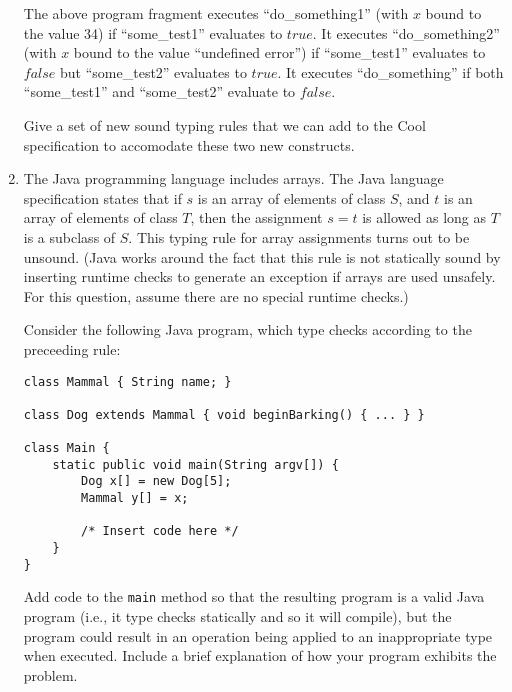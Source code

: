 \documentclass{article}
\begin{document}
\begin{enumerate}
The above program fragment executes
  ``do\_something1'' (with $x$ bound to the value 34) if ``some\_test1''
  evaluates to $true$. It executes ``do\_something2'' (with $x$ bound to the
  value ``undefined error'') if ``some\_test1'' evaluates to $false$ but
  ``some\_test2'' evaluates to $true$. It executes ``do\_something'' if both
  ``some\_test1'' and ``some\_test2'' evaluate to $false$. 


Give a set of new sound typing rules that we can add to the Cool specification
to accomodate these two new constructs. 



\item The Java programming language includes arrays.  The Java
language specification states that if $s$ is an array of elements of
class $S$, and $t$ is an array of elements of class $T$, then the
assignment $s = t$ is allowed as long as $T$ is a subclass of $S$.
This typing rule for array assignments turns out to be unsound. (Java
works around the fact that this rule is not statically sound by inserting
runtime checks to generate an exception if arrays are used
unsafely. For this question, assume there are no special runtime checks.)

Consider the following Java program, which type checks according
to the preceeding rule:
\begin{verbatim}
class Mammal { String name; }

class Dog extends Mammal { void beginBarking() { ... } }

class Main {
    static public void main(String argv[]) {
        Dog x[] = new Dog[5];
        Mammal y[] = x;

        /* Insert code here */
    }
}
\end{verbatim}
Add code to the \texttt{main} method so that the resulting program is
a valid Java program (i.e., it type checks statically and so it will
compile), but the program could result in an operation being applied
to an inappropriate type when executed.  Include a brief explanation
of how your program exhibits the problem.


\end{enumerate}
\end{document}
